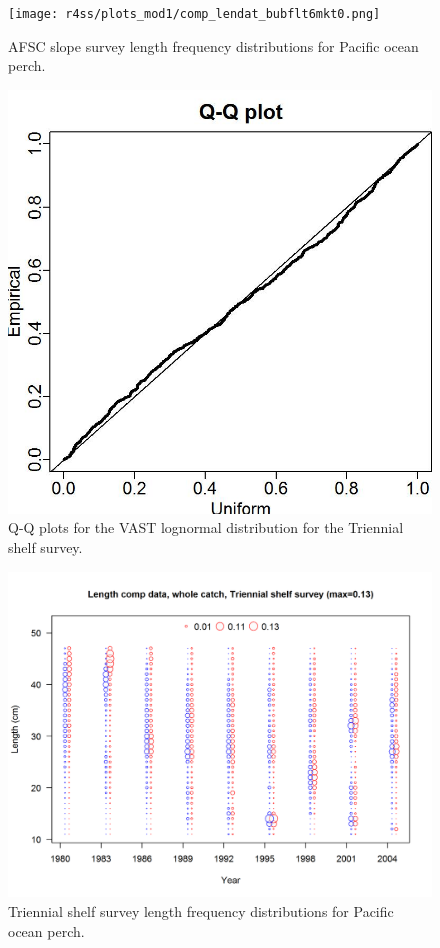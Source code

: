 \documentclass[12pt,]{article}
\begin{document}
\FloatBarrier

\begin{figure}
\centering
\texttt{[image: r4ss/plots\_mod1/comp\_lendat\_bubflt6mkt0.png]}
\caption{AFSC slope survey length frequency distributions for Pacific
ocean perch. \label{fig:afsc_Length}}
\end{figure}

\FloatBarrier

\begin{figure}
\centering
\includegraphics{Figures/Q-Q_plot_triennial.jpg}
\caption{Q-Q plots for the VAST lognormal distribution for the Triennial
shelf survey. \label{fig:tri_qq}}
\end{figure}

\FloatBarrier

\begin{figure}
\centering
\includegraphics{r4ss/plots_mod1/comp_lendat_bubflt5mkt0.png}
\caption{Triennial shelf survey length frequency distributions for
Pacific ocean perch. \label{fig:Tri_Length}}
\end{figure}
\end{document}
